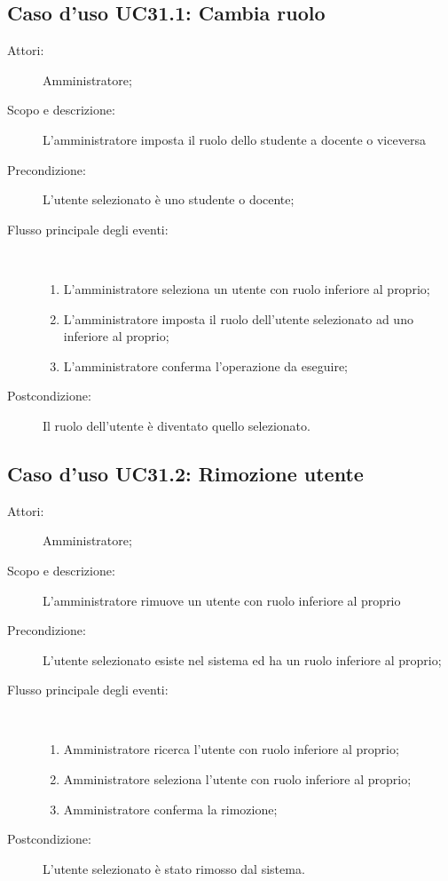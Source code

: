 \subsection{Caso d'uso UC31.1: Cambia ruolo}\begin{description}
	\item[Attori:] Amministratore;
	\item[Scopo e descrizione:] L'amministratore imposta il ruolo dello studente a docente o viceversa
	\item[Precondizione:] L'utente selezionato è uno studente o docente;
	
	\item[Flusso principale degli eventi:] \ 
	\begin{enumerate}
		\item L'amministratore seleziona un utente con ruolo inferiore al proprio;
		\item L'amministratore imposta il ruolo dell'utente selezionato ad uno inferiore al proprio;
		\item L'amministratore conferma l'operazione da eseguire;
		
	\end{enumerate}
	\item[Postcondizione:] Il ruolo dell'utente è diventato quello selezionato.
\end{description}
\hypertarget{UC31.2}{}
\subsection{Caso d'uso UC31.2: Rimozione utente}\begin{description}
	\item[Attori:] Amministratore;
	\item[Scopo e descrizione:] L'amministratore rimuove un utente con ruolo inferiore al proprio
	\item[Precondizione:] L'utente selezionato esiste nel sistema ed ha un ruolo inferiore al proprio;
	
	\item[Flusso principale degli eventi:] \ 
	\begin{enumerate}
		\item Amministratore ricerca l'utente con ruolo inferiore al proprio;
		\item Amministratore seleziona l'utente con ruolo inferiore al proprio;
		\item Amministratore conferma la rimozione;
		
	\end{enumerate}
	\item[Postcondizione:] L'utente selezionato è stato rimosso dal sistema.
\end{description}
\hypertarget{UC32}{}

